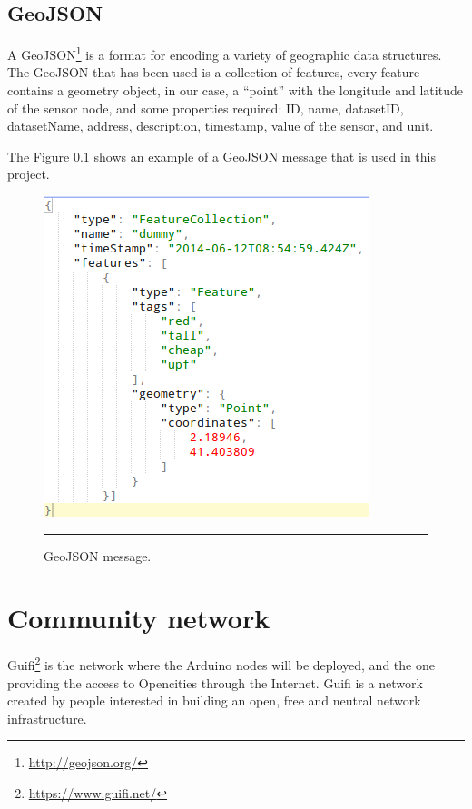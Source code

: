 \documentclass[12pt, a4paper,twoside]{tesi_upf}
\begin{document}
    \subsection{GeoJSON}
    \label{GeoJSON}
      A GeoJSON\footnote{\url{http://geojson.org/}} is a format for encoding a variety of geographic data structures. The GeoJSON that has been used is a collection of features, every feature contains a geometry object, in our case, a ``point'' with the longitude and latitude of the sensor node, and some properties required: ID, name, datasetID, datasetName, address, description, timestamp, value of the sensor, and unit.
      
      The Figure \ref{GeoJSON} shows an example of a GeoJSON message that is used in this project.
      \begin{figure}[htbp]
        \centering
            \includegraphics[scale=0.5]{./Figures/GeoJSON.png}
            \\
            \rule{15em}{0.5pt}
        \caption[GeoJSON message]{GeoJSON message.}
        \label{fig:GeoJSON}
      \end{figure}
    
  \section{Community network}
    Guifi\footnote{\url{https://www.guifi.net/}} is the network where the Arduino nodes will be deployed, and the one providing the access to Opencities through the Internet.
    Guifi is a network created by people interested in building an open, free and neutral network infrastructure.
    
\end{document}
